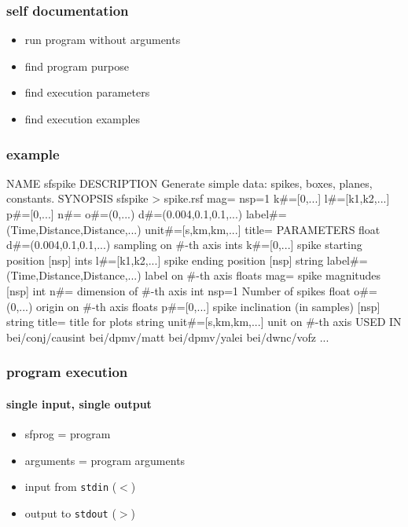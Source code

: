 \begin{frame} \frametitle{self documentation}

  \begin{itemize}
  \item run program without arguments
  \item find program purpose
  \item find execution parameters
  \item find execution examples
  \end{itemize}
  
\end{frame}
\cwpnote{}

\begin{frame}[fragile] \frametitle{example}


\tiny
\begin{semiverbatim}
NAME
        sfspike
DESCRIPTION
        Generate simple data: spikes, boxes, planes, constants.
SYNOPSIS
        sfspike > spike.rsf mag= nsp=1 k#=[0,...] l#=[k1,k2,...] p#=[0,...] n#=
o#=(0,...) d#=(0.004,0.1,0.1,...) label#=(Time,Distance,Distance,...) unit#=[s,km,km,...] title=
PARAMETERS
        float   d#=(0.004,0.1,0.1,...)  sampling on #-th axis
        ints    k#=[0,...]      spike starting position  [nsp]
        ints    l#=[k1,k2,...]  spike ending position  [nsp]
        string  label#=(Time,Distance,Distance,...)     label on #-th axis
        floats  mag=    spike magnitudes  [nsp]
        int     n#=     dimension of #-th axis
        int     nsp=1   Number of spikes
        float   o#=(0,...)      origin on #-th axis
        floats  p#=[0,...]      spike inclination (in samples)  [nsp]
        string  title=  title for plots
        string  unit#=[s,km,km,...]     unit on #-th axis
USED IN
        bei/conj/causint
        bei/dpmv/matt
        bei/dpmv/yalei
        bei/dwnc/vofz
	...
\end{semiverbatim}
\end{frame}
\cwpnote{}

\begin{frame} \frametitle{program execution}
  \framesubtitle{single input, single output}

  
  \vfill
  
  \begin{itemize}
  \item sfprog = \mg program
  \item arguments = program arguments
  \item input from \texttt{stdin} ($<$)
  \item output to \texttt{stdout} ($>$)
  \end{itemize}
  
\end{frame}
\cwpnote{}

